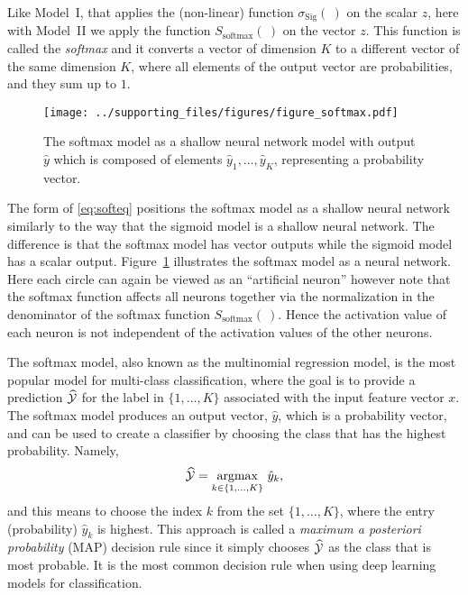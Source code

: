 Like Model~I, that applies the (non-linear) function $\sigma_{\text{Sig}}(~)$ on the scalar $z$, here with Model~II we apply the function $S_{\textrm{softmax}}(~)$ on the vector $z$. This function is called the {\em softmax} and it converts a vector of dimension $K$ to a different vector of the same dimension $K$, where all elements of the output vector are probabilities, and they sum up to $1$.

\begin{figure}[h]
\begin{center}
\texttt{[image: ../supporting\_files/figures/figure\_softmax.pdf]}%
\end{center}
\caption{The softmax model as a shallow neural network model with output $\hat{y}$ which is composed of elements $\hat{y}_1, \ldots, \hat{y}_K$,  representing a probability vector. }
\label{fig:shalsoft}
\end{figure}

The form of \eqref{eq:softeq} positions the softmax model as a shallow neural network similarly to the way that the sigmoid model is a shallow neural network. The difference is that the softmax model has vector outputs while the sigmoid model has a scalar output. Figure~\ref{fig:shalsoft} illustrates the softmax model as a neural network. Here each circle can again be viewed as an ``artificial neuron'' however note that the softmax function %
affects all neurons together via the normalization in the denominator of the softmax function $S_{\textrm{softmax}}(~)$. Hence the activation value of each neuron is not independent of the activation values of the other neurons.

The softmax model, also known as the multinomial regression model, is the most popular model for multi-class classification, where the goal is to provide a prediction $\widehat{\cal Y}$ for the label in $\{1,\ldots,K\}$ associated with the input feature vector $x$.  The softmax model produces an output vector, $\hat{y}$, which is a probability vector, and can be used to create a classifier by choosing the class that has the highest probability. Namely,
%
\begin{equation}
\label{eq:argmax-mp}
\widehat{\cal Y}=\underset{k \in\{1, \ldots, K\}}{\operatorname{argmax}} ~\hat{y}_k,
\end{equation}
%
and this means to choose the index $k$ from the set $\{1,\ldots,K\}$, where the entry (probability) $\hat{y}_k$ is highest. 
This approach is called a \textit{maximum a posteriori probability} (MAP) decision rule since it simply chooses $\widehat{\cal Y}$ as the class that is most probable. It is the most common decision rule when using deep learning models for classification. \\

